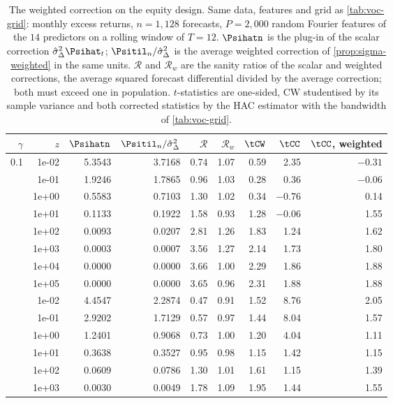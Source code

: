 \begin{table}[htbp]
\centering
\caption{The weighted correction on the equity design. Same data, features and grid as \cref{tab:voc-grid}: monthly excess returns, $n=1{,}128$ forecasts, $P=2{,}000$ random Fourier features of the $14$ predictors on a rolling window of $T=12$. $\Psihatn$ is the plug-in of the scalar correction $\hat\sigma^2_\Delta\Psihat_t$; $\Psitil_n/\hat\sigma^2_\Delta$ is the average weighted correction of \cref{prop:sigma-weighted} in the same units. $\mathcal R$ and $\mathcal R_w$ are the sanity ratios of the scalar and weighted corrections, the average squared forecast differential divided by the average correction; both must exceed one in population. $t$-statistics are one-sided, CW studentised by its sample variance and both corrected statistics by the HAC estimator with the bandwidth of \cref{tab:voc-grid}.}
\label{tab:voc-weighted}
\small
\begin{tabular}{rrrrrrrrr}
\toprule
$\gamma$ & $z$ & $\Psihatn$ & $\Psitil_n/\hat\sigma^2_\Delta$ & $\mathcal R$ & $\mathcal R_w$ & $\tCW$ & $\tCC$ & $\tCC$, weighted \\
\midrule
0.1 & 1e-02 & 5.3543 & 3.7168 & 0.74 & 1.07 & 0.59 & 2.35 & $-0.31$ \\
 & 1e-01 & 1.9246 & 1.7865 & 0.96 & 1.03 & 0.28 & 0.36 & $-0.06$ \\
 & 1e+00 & 0.5583 & 0.7103 & 1.30 & 1.02 & 0.34 & $-0.76$ & 0.14 \\
 & 1e+01 & 0.1133 & 0.1922 & 1.58 & 0.93 & 1.28 & $-0.06$ & 1.55 \\
 & 1e+02 & 0.0093 & 0.0207 & 2.81 & 1.26 & 1.83 & 1.24 & 1.62 \\
 & 1e+03 & 0.0003 & 0.0007 & 3.56 & 1.27 & 2.14 & 1.73 & 1.80 \\
 & 1e+04 & 0.0000 & 0.0000 & 3.66 & 1.00 & 2.29 & 1.86 & 1.88 \\
 & 1e+05 & 0.0000 & 0.0000 & 3.65 & 0.96 & 2.31 & 1.88 & 1.88 \\
\addlinespace
0.3 & 1e-02 & 4.4547 & 2.2874 & 0.47 & 0.91 & 1.52 & 8.76 & 2.05 \\
 & 1e-01 & 2.9202 & 1.7129 & 0.57 & 0.97 & 1.44 & 8.04 & 1.57 \\
 & 1e+00 & 1.2401 & 0.9068 & 0.73 & 1.00 & 1.20 & 4.04 & 1.11 \\
 & 1e+01 & 0.3638 & 0.3527 & 0.95 & 0.98 & 1.15 & 1.42 & 1.15 \\
 & 1e+02 & 0.0609 & 0.0786 & 1.30 & 1.01 & 1.61 & 1.15 & 1.39 \\
 & 1e+03 & 0.0030 & 0.0049 & 1.78 & 1.09 & 1.95 & 1.44 & 1.55 \\

\end{tabular}
\end{table}

